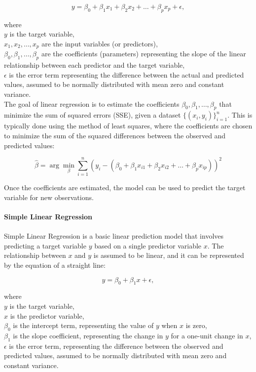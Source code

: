 \documentclass[12pt]{report}
\begin{document}
\begin{equation}\label{eq2}
    y = \beta_0 + \beta_1 x_1 + \beta_2 x_2 + \ldots + \beta_p x_p + \epsilon,
\end{equation}

\noindent where\\
$y$ is the target variable,\\
$x_1, x_2, \ldots, x_p$ are the input variables (or predictors),\\
$\beta_0, \beta_1, \ldots, \beta_p$ are the coefficients (parameters) representing the slope of the linear relationship between each predictor and the target variable,\\
$\epsilon$ is the error term representing the difference between the actual and predicted values, assumed to be normally distributed with mean zero and constant variance.\\

\noindent The goal of linear regression is to estimate
the coefficients $\beta_0, \beta_1, \ldots, \beta_p$ that minimize the sum of squared
errors (SSE), given a dataset $\{(x_i, y_i)\}_{i=1}^n$. This is typically done using the
method of least squares, where the coefficients are chosen to minimize the sum of the
squared differences between the observed and predicted values:

\begin{equation}
    \hat{\beta} = \arg \min_{\beta} \sum_{i=1}^{n} (y_i - (\beta_0 + \beta_1 x_{i1} + \beta_2 x_{i2} + \ldots + \beta_p x_{ip}))^2
\end{equation}

\noindent Once the coefficients are estimated, the model can be used to predict the target
variable for new observations.\\
\\
\textbf{Simple Linear Regression}\\
\\
Simple Linear Regression is a basic linear prediction model that involves predicting a target
variable \(y\) based on a single predictor variable \(x\). The relationship
between \(x\) and \(y\) is assumed to be linear, and it can be represented by the
equation of a straight line:

\begin{equation}
    y = \beta_0 + \beta_1 x + \epsilon,
\end{equation}

\noindent where\\
\(y\) is the target variable,\\
\(x\) is the predictor variable,\\
\(\beta_0\) is the intercept term, representing the value of \(y\) when \(x\) is zero,\\
\(\beta_1\) is the slope coefficient, representing the change in \(y\) for a one-unit change in \(x\),\\
\(\epsilon\) is the error term, representing the difference between the observed and predicted values, assumed to be normally distributed with mean zero and constant variance.\\
\end{document}
